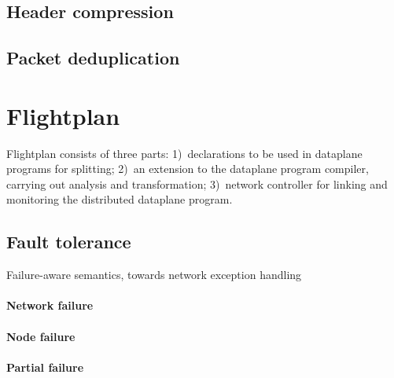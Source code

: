 \documentclass[letterpaper,twocolumn,10pt]{article}
\begin{document}
\subsection{Header compression}
\subsection{Packet deduplication}


\section{Flightplan}
Flightplan consists of three parts:
1)~declarations to be used in dataplane programs for splitting;
2)~an extension to the dataplane program compiler, carrying out analysis and
transformation;
3)~network controller for linking and monitoring the distributed dataplane program.


%
%

\subsection{Fault tolerance}
Failure-aware semantics, towards network exception handling~\cite{Karagiannis:2008:NEH:1402946.1402973}

\paragraph{Network failure}
\paragraph{Node failure}
\paragraph{Partial failure}
%
%
%
%
\end{document}
